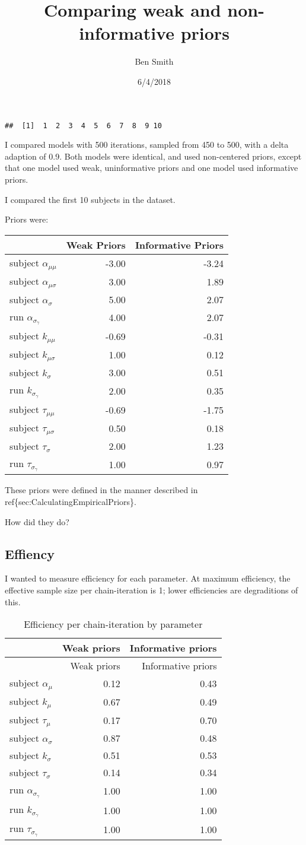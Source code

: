 \documentclass[]{article}
\title{Comparing weak and non-informative priors}
\author{Ben Smith}
\date{6/4/2018}
\begin{document}
\maketitle

\begin{verbatim}
##  [1]  1  2  3  4  5  6  7  8  9 10
\end{verbatim}

I compared models with 500 iterations, sampled from 450 to 500, with a
delta adaption of 0.9. Both models were identical, and used non-centered
priors, except that one model used weak, uninformative priors and one
model used informative priors.

I compared the first 10 subjects in the dataset.

Priors were:

\begin{longtable}[]{@{}lrr@{}}
\toprule
& Weak Priors & Informative Priors\tabularnewline
\midrule
\endhead
subject \(\alpha_{\mu\mu}\) & -3.00 & -3.24\tabularnewline
subject \(\alpha_{\mu\sigma}\) & 3.00 & 1.89\tabularnewline
subject \(\alpha_{\sigma}\) & 5.00 & 2.07\tabularnewline
run \(\alpha_{\sigma_{\gamma}}\) & 4.00 & 2.07\tabularnewline
subject \(k_{\mu\mu}\) & -0.69 & -0.31\tabularnewline
subject \(k_{\mu\sigma}\) & 1.00 & 0.12\tabularnewline
subject \(k_{\sigma}\) & 3.00 & 0.51\tabularnewline
run \(k_{\sigma_{\gamma}}\) & 2.00 & 0.35\tabularnewline
subject \(\tau_{\mu\mu}\) & -0.69 & -1.75\tabularnewline
subject \(\tau_{\mu\sigma}\) & 0.50 & 0.18\tabularnewline
subject \(\tau_{\sigma}\) & 2.00 & 1.23\tabularnewline
run \(\tau_{\sigma_{\gamma}}\) & 1.00 & 0.97\tabularnewline
\bottomrule
\end{longtable}

These priors were defined in the manner described in
ref\{sec:CalculatingEmpiricalPriors\}.

How did they do?

\subsection{Effiency}\label{effiency}

I wanted to measure efficiency for each parameter. At maximum
efficiency, the effective sample size per chain-iteration is 1; lower
efficiencies are degraditions of this.

\begin{longtable}[]{@{}lrr@{}}
\caption{Efficiency per chain-iteration by parameter}\tabularnewline
\toprule
& Weak priors & Informative priors\tabularnewline
\midrule
\endfirsthead
\toprule
& Weak priors & Informative priors\tabularnewline
\midrule
\endhead
subject \(\alpha_{\mu}\) & 0.12 & 0.43\tabularnewline
subject \(k_{\mu}\) & 0.67 & 0.49\tabularnewline
subject \(\tau_{\mu}\) & 0.17 & 0.70\tabularnewline
subject \(\alpha_{\sigma}\) & 0.87 & 0.48\tabularnewline
subject \(k_{\sigma}\) & 0.51 & 0.53\tabularnewline
subject \(\tau_{\sigma}\) & 0.14 & 0.34\tabularnewline
run \(\alpha_{\sigma_{\gamma}}\) & 1.00 & 1.00\tabularnewline
run \(k_{\sigma_{\gamma}}\) & 1.00 & 1.00\tabularnewline
run \(\tau_{\sigma_{\gamma}}\) & 1.00 & 1.00\tabularnewline
\bottomrule
\end{longtable}
\end{document}
